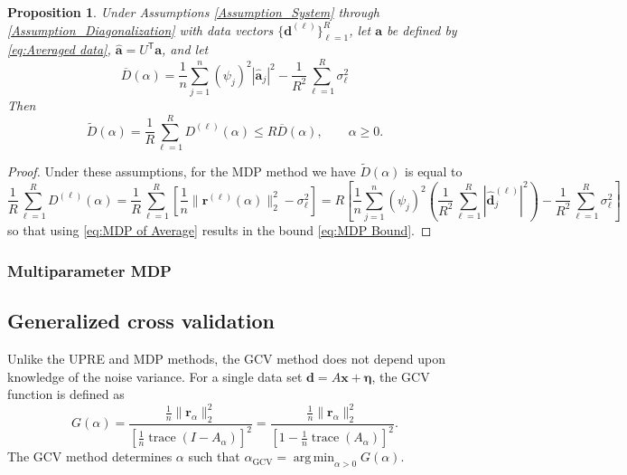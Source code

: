 \documentclass[12pt]{article}
\newcommand{\aVec}{\mathbf{a}}	%
\newcommand{\dVec}{\mathbf{d}}	%
\newcommand{\rVec}{\mathbf{r}}	%
\newcommand{\xVec}{\mathbf{x}}	%
\newcommand{\trans}[1]{{#1}^\mathsf{T}}	%
\DeclareMathOperator{\trace}{trace}		%
\newcommand{\dft}[1]{\widehat{#1}}	%
\newcommand{\regparam}{\alpha}  %
\DeclareMathOperator*{\argmin}{arg\,min}
\newcommand{\mfilt}{\psi}
\newcommand{\noise}{\eta}	%
\newcommand{\noiseSD}{\sigma}	%
\newcommand{\noiseVec}{\bm{\noise}}	%
\newcommand{\regres}{\mathbf{r}_{\regparam}}	%
\newcommand{\A}{A_{\regparam}}	%
\newcommand{\G}{G}	%
\newcommand{\GCV}{\text{GCV}}	%
\newcommand{\D}{D}	%
\newtheorem{proposition}{Proposition}[section]
\begin{document}
\begin{proposition}
Under Assumptions \ref{Assumption_System} through \ref{Assumption_Diagonalization} with data vectors $\{\dVec^{(\ell)}\}_{\ell=1}^R$, let $\aVec$ be defined by \eqref{eq:Averaged data}, $\dft{\aVec} = \trans{U}\aVec$, and let
\begin{equation}
\label{eq:MDP of Average}
\overline{\D}(\regparam) = \frac{1}{n}\sum_{j=1}^{n} \left(\mfilt_j\right)^2 |\dft{\aVec}_j|^2 - \frac{1}{R^2}\sum_{\ell=1}^R \noiseSD_{\ell}^2
\end{equation}
Then
\begin{equation}
\label{eq:MDP Bound}
\widetilde{\D}(\regparam) = \frac{1}{R} \sum_{\ell=1}^R \D^{(\ell)}(\regparam) \leq R \overline{\D}(\regparam), \qquad \regparam \geq 0.
\end{equation}
\end{proposition}
\begin{proof}
Under these assumptions, for the MDP method we have $\widetilde{\D}(\regparam)$ is equal to
\[\frac{1}{R} \sum_{\ell=1}^R \D^{(\ell)}(\regparam) = \frac{1}{R}\sum_{\ell=1}^R \left[\frac{1}{n}\|\rVec^{(\ell)}(\regparam)\|_2^2 - \noiseSD_{\ell}^2\right] = R\left[\frac{1}{n}\sum_{j=1}^{n} \left(\mfilt_j\right)^2\left(\frac{1}{R^2} \sum_{\ell=1}^R |\dft{\dVec}_j^{(\ell)}|^2\right) - \frac{1}{R^2}\sum_{\ell=1}^R \noiseSD_{\ell}^2\right]\]
so that using \eqref{eq:MDP of Average} results in the bound \eqref{eq:MDP Bound}.
\end{proof}

\subsubsection{Multiparameter MDP} \label{sec:Multiparameter MDP}

\subsection{Generalized cross validation} \label{sec:GCV}
Unlike the UPRE and MDP methods, the GCV method does not depend upon knowledge of the noise variance. For a single data set $\dVec = A\xVec + \noiseVec$, the GCV function is defined as
\begin{equation}
\label{eq:GCV}
\G(\regparam) = \frac{\frac{1}{n}\|\regres\|_2^2}{\left[\frac{1}{n}\trace(I-\A)\right]^2} = \frac{\frac{1}{n}\|\regres\|_2^2}{\left[1 - \frac{1}{n}\trace(\A)\right]^2}.
\end{equation}
The GCV method determines $\regparam$ such that $\regparam_\GCV = \argmin_{\regparam > 0} \G(\regparam)$.
\end{document}
